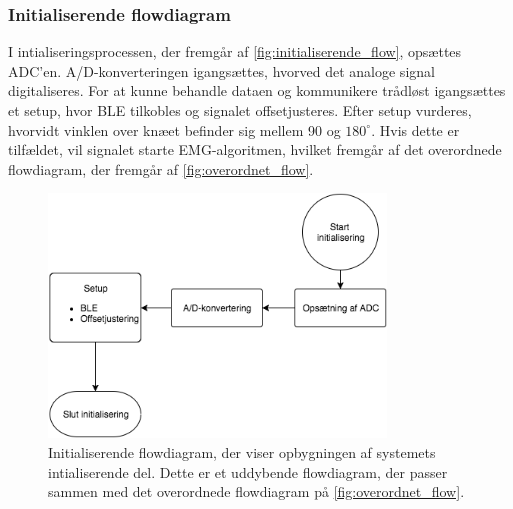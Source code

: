 \subsubsection{Initialiserende flowdiagram}
I intialiseringsprocessen, der fremgår af \autoref{fig:initialiserende_flow}, opsættes ADC'en. A/D-konverteringen igangsættes, hvorved det analoge signal digitaliseres. For at kunne behandle dataen og kommunikere trådløst igangsættes et setup, hvor BLE tilkobles og signalet offsetjusteres. Efter setup vurderes, hvorvidt vinklen over knæet befinder sig mellem 90 og $180^{\circ}$. Hvis dette er tilfældet, vil signalet starte EMG-algoritmen, hvilket fremgår af det overordnede flowdiagram, der fremgår af \autoref{fig:overordnet_flow}. 
\begin{figure}[H]
\centering
\includegraphics[width=0.8\textwidth]{figures/implementering/initialiserende_flow.png}
\caption{Initialiserende flowdiagram, der viser opbygningen af systemets intialiserende del. Dette er et uddybende flowdiagram, der passer sammen med det overordnede flowdiagram på \autoref{fig:overordnet_flow}.}
\label{fig:initialiserende_flow}
\end{figure}

